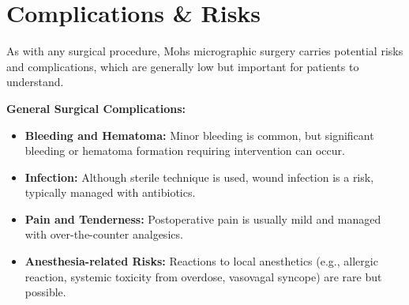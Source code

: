 \section*{Complications \& Risks}
As with any surgical procedure, Mohs micrographic surgery carries potential risks and complications, which are generally low but important for patients to understand.

\textbf{General Surgical Complications:}
\begin{itemize}
  \item \textbf{Bleeding and Hematoma:} Minor bleeding is common, but significant bleeding or hematoma formation requiring intervention can occur.
  
  \item \textbf{Infection:} Although sterile technique is used, wound infection is a risk, typically managed with antibiotics.
  
  \item \textbf{Pain and Tenderness:} Postoperative pain is usually mild and managed with over-the-counter analgesics.
  
  \item \textbf{Anesthesia-related Risks:} Reactions to local anesthetics (e.g., allergic reaction, systemic toxicity from overdose, vasovagal syncope) are rare but possible.
\end{itemize}

